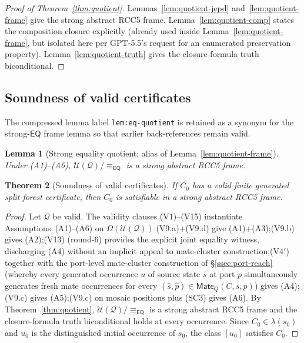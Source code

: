 \documentclass[11pt]{article}
\newtheorem{theorem}{Theorem}[section]
\newtheorem{lemma}[theorem]{Lemma}
\newcommand{\EQ}{\mathsf{EQ}}
\newcommand{\Q}{\mathcal Q}
\newcommand{\U}{\mathcal U}
\newcommand{\Mate}{\mathsf{Mate}}
\newcommand{\eqc}{\equiv_{\EQ}}
\begin{document}
\begin{proof}[Proof of Theorem~\ref{thm:quotient}]
Lemmas~\ref{lem:quotient-jepd} and~\ref{lem:quotient-frame} give the
strong abstract RCC5 frame.  Lemma~\ref{lem:quotient-comp} states
the composition closure explicitly (already used inside
Lemma~\ref{lem:quotient-frame}, but isolated here per GPT-5.5's
request for an enumerated preservation property).
Lemma~\ref{lem:quotient-truth} gives the closure-formula truth
biconditional.
\end{proof}

\subsection{Soundness of valid certificates}
\label{ssec:soundness-corollary}

The compressed lemma label \texttt{lem:eq-quotient} is retained as a
synonym for the strong-$\EQ$ frame lemma so that earlier
back-references remain valid.

\begin{lemma}[Strong equality quotient; alias of Lemma~\ref{lem:quotient-frame}]\label{lem:eq-quotient}
Under (A1)--(A6), $\U(\Q)/\eqc$ is a strong abstract RCC5 frame.
\end{lemma}

\begin{theorem}[Soundness of valid certificates]\label{thm:soundness}
If $C_0$ has a valid finite generated split-forest certificate, then
$C_0$ is satisfiable in a strong abstract RCC5 frame.
\end{theorem}

\begin{proof}
Let $\Q$ be valid.  The validity clauses (V1)--(V15) instantiate
Assumptions~(A1)--(A6) on $\Omega(\U(\Q))$:\@ (V9.a)+(V9.d) give
(A1)+(A3);\@ (V9.b) gives (A2);\@ (V13) (round-6) provides the
explicit joint equality witness, discharging (A4) without an
implicit appeal to mate-cluster construction;\@ (V4$'$) together
with the port-level mate-cluster construction of
\S\ref{ssec:port-reach} (whereby every
generated occurrence $u$ of source state $s$ at port $p$
simultaneously generates fresh mate occurrences for every
$(\widehat s,\widehat p)\in\Mate_Q(C,s,p)$) gives (A4);\@ (V9.c)
gives (A5);\@ (V9.c) on mosaic positions plus (SC3) gives (A6).
By Theorem~\ref{thm:quotient}, $\U(\Q)/\eqc$ is a strong abstract
RCC5 frame and the closure-formula truth biconditional holds at every
occurrence.  Since $C_0\in\lambda(s_0)$ and $u_0$ is the distinguished
initial occurrence of $s_0$, the class $[u_0]$ satisfies $C_0$.
\end{proof}
\end{document}
